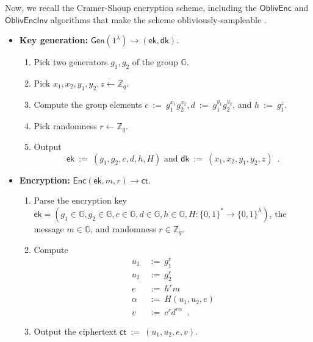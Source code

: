 \documentclass[11pt,letterpaper]{article}
\theoremstyle{plain} %
\theoremstyle{definition} %
\theoremstyle{remark} %
\newcommand{\eqdef}{\ {:=} \ }
\newcommand{\SecParam}{\lambda}
\newcommand{\Gen}{\mathsf{Gen}}
\newcommand{\Enc}{\mathsf{Enc}}
\newcommand{\OblivEnc}{\mathsf{OblivEnc}}
\newcommand{\OblivEncInv}{\mathsf{OblivEncInv}}
\newcommand{\EncKey}{\mathsf{ek}}
\newcommand{\DecKey}{\mathsf{dk}}
\newcommand{\Msg}{m}
\newcommand{\Ct}{\mathsf{ct}}
\newcommand{\Rand}{r}
\newcommand{\Bits}{\{0,1\}}
\newcommand{\Integers}{\mathbb{Z}}
\newcommand{\Group}{\mathbb{G}}
\newcommand{\GrpOrd}{q}
\newcommand{\GrpEltC}{c}
\newcommand{\GrpEltD}{d}
\newcommand{\GrpEltE}{e}
\newcommand{\GrpEltH}{h}
\newcommand{\GrpEltU}{u}
\newcommand{\GrpEltV}{v}
\newcommand{\Generator}{g}
\newcommand{\Hash}{H}
\newcommand{\ExpX}{x}
\newcommand{\ExpY}{y}
\newcommand{\ExpZ}{z}
\newcommand{\Tag}{\alpha}
\begin{document}
Now, we recall the Cramer-Shoup encryption scheme, including the $\OblivEnc$ and $\OblivEncInv$ algorithms that make the scheme obliviously-sampleable \cite{CanettiF01}.
\begin{itemize}[nolistsep]
    \item \textbf{Key generation:} $\Gen(1^{\SecParam}) \to (\EncKey, \DecKey)$.
    \begin{enumerate}[nolistsep]
        \item Pick two generators $\Generator_1, \Generator_2$ of the group $\Group$.
        \item Pick $\ExpX_1, \ExpX_2, \ExpY_1, \ExpY_2, \ExpZ \gets \Integers_{\GrpOrd}$.
        \item Compute the group elements $\GrpEltC \eqdef \Generator_1^{\ExpX_1}\Generator_2^{\ExpX_2}, \GrpEltD \eqdef \Generator_1^{\ExpY_1}\Generator_2^{\ExpY_2}$, and $\GrpEltH \eqdef \Generator_1^{\ExpZ}$.
        \item Pick randomness $\Rand \gets \Integers_{\GrpOrd}$.
        \item Output
        \begin{equation*}
            \EncKey \eqdef (\Generator_1, \Generator_2, \GrpEltC, \GrpEltD, \GrpEltH, \Hash)
            \textrm{ and }
            \DecKey \eqdef (\ExpX_1, \ExpX_2, \ExpY_1, \ExpY_2, \ExpZ)
            \enspace.
        \end{equation*}
    \end{enumerate}

    \item \textbf{Encryption:} $\Enc(\EncKey, \Msg, \Rand) \to \Ct$.
    \begin{enumerate}[nolistsep]
        \item Parse the encryption key $\EncKey = (\Generator_1 \in \Group, \Generator_2 \in \Group, \GrpEltC\in \Group, \GrpEltD\in \Group, \GrpEltH\in \Group, \Hash \colon \Bits^{*} \to \Bits^{\SecParam})$, the message $\Msg \in \Group$, and randomness $\Rand \in \Integers_{\GrpOrd}$.
        \item Compute
        \begin{align*}
            \GrpEltU_1 &\eqdef \Generator_1^{\Rand}\\
            \GrpEltU_2 &\eqdef \Generator_2^{\Rand}\\
            \GrpEltE &\eqdef \GrpEltH^{\Rand}\Msg\\
            \Tag &\eqdef \Hash(\GrpEltU_1, \GrpEltU_2, \GrpEltE)\\
            \GrpEltV &\eqdef \GrpEltC^{\Rand}\GrpEltD^{\Rand\Tag}
            \enspace.
        \end{align*}
        \item Output the ciphertext $\Ct \eqdef (\GrpEltU_1, \GrpEltU_2, \GrpEltE, \GrpEltV)$.
    \end{enumerate}


\end{itemize}
\end{document}
